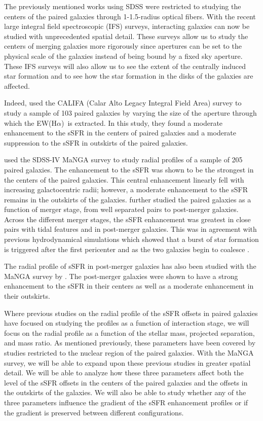 \documentclass[iop,revtex4,twocolumn,apj,numberedappendix,appendixfloats]{emulateapj}
\newcommand{\ewha}{EW(H$\alpha$)}
\begin{document}
The previously mentioned works using SDSS were restricted to studying the centers of the paired galaxies through 1-1.5\arcsec-radius optical fibers. With the recent large integral field spectroscopic (IFS) surveys, interacting galaxies can now be studied with unprecedented spatial detail. These surveys allow us to study the centers of merging galaxies more rigorously since apertures can be set to the physical scale of the galaxies instead of being bound by a fixed sky aperture. These IFS surveys will also allow us to see the extent of the centrally induced star formation and to see how the star formation in the disks of the galaxies are affected. 

Indeed, \citet{Barrera-Ballesteros:2015} used the CALIFA (Calar Alto Legacy Integral Field Area) survey to study a sample of 103 paired galaxies by varying the size of the aperture through which the \ewha\ is extracted. In this study, they found a moderate enhancement to the sSFR in the centers of paired galaxies and a moderate suppression to the sSFR in outskirts of the paired galaxies. 

\citet{Pan:2019} used the SDSS-IV MaNGA survey to study radial profiles of a sample of 205 paired galaxies. The enhancement to the sSFR was shown to be the strongest in the centers of the paired galaxies. This central enhancement linearly fell with increasing galactocentric radii; however, a moderate enhancement to the sSFR remains in the outskirts of the galaxies. \citet{Pan:2019} further studied the paired galaxies as a function of merger stage, from well separated pairs to post-merger galaxies. Across the different merger stages, the sSFR enhancement was greatest in close pairs with tidal features and in post-merger galaxies. This was in agreement with previous hydrodynamical simulations which showed that a burst of star formation is triggered after the first pericenter and as the two galaxies begin to coalesce \citep{Scudder:2012}. 

The radial profile of sSFR in post-merger galaxies has also been studied with the MaNGA survey by \citet{Thorp:2019}. The post-merger galaxies were shown to have a strong enhancement to the sSFR in their centers as well as a moderate enhancement in their outskirts. 

Where previous studies on the radial profile of the sSFR offsets in paired galaxies have focused on studying the profiles as a function of interaction stage, we will focus on the radial profile as a function of the stellar mass, projected separation, and mass ratio. As mentioned previously, these parameters have been covered by studies restricted to the nuclear region of the paired galaxies. With the MaNGA survey, we will be able to expand upon these previous studies in greater spatial detail. We will be able to analyze how these three parameters affect both the level of the sSFR offsets in the centers of the paired galaxies and the offsets in the outskirts of the galaxies. We will also be able to study whether any of the three parameters influence the gradient of the sSFR enhancement profiles or if the gradient is preserved between different configurations. 
\end{document}
